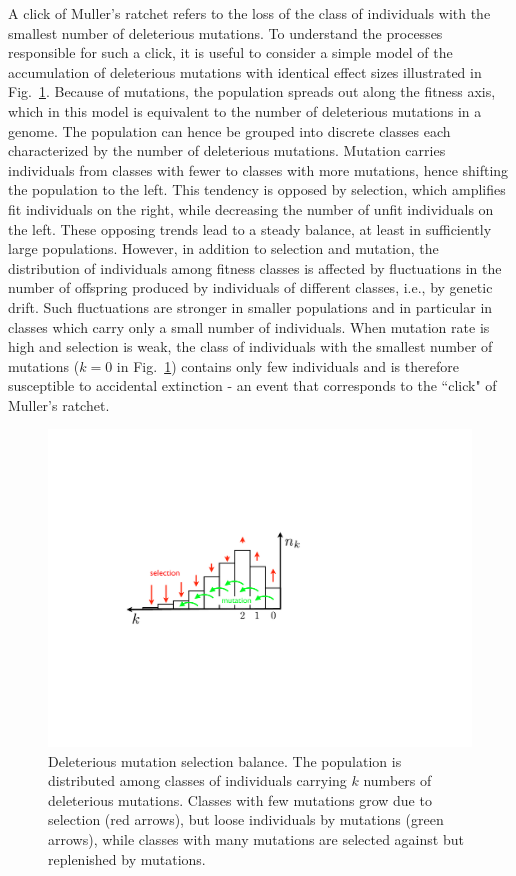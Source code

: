 \documentclass[rmp,preprint]{revtex4}
\newcommand{\FIG}[1]{Fig.~\ref{fig:#1}}
\begin{document}
A click of Muller's ratchet refers to the loss of the class of individuals with the smallest number of deleterious mutations. To understand the processes responsible for such a click, it is useful to consider a simple model of the accumulation of deleterious mutations with identical effect sizes illustrated in \FIG{sketch}. Because of mutations, the population spreads out along the fitness axis, which in this model is equivalent to the number of deleterious mutations in a genome. The population can hence be grouped into discrete classes each characterized by the number of deleterious mutations. Mutation carries individuals from classes with fewer to classes with more mutations, hence shifting the population to the left. This tendency is opposed by selection, which amplifies fit individuals on the right, while decreasing the number of unfit individuals on the left. These opposing trends lead to a steady balance, at least in sufficiently large populations. However, in addition to selection and mutation, the distribution of individuals among fitness classes is affected by fluctuations in the number of offspring produced by individuals of different classes, i.e., by genetic drift. Such fluctuations are stronger in smaller populations and in particular in classes which carry only a small number of individuals.  When mutation rate is high and selection is weak, the class of individuals with the smallest number of mutations ($k=0$ in \FIG{sketch}) contains only few individuals and is therefore susceptible to accidental extinction - an event that corresponds to the ``click" of Muller's ratchet.


\begin{figure}[b]
\begin{center}
  \includegraphics[width=0.5\columnwidth]{Figures/sketch}
  \caption[labelInTOC]{Deleterious mutation selection balance. The population is distributed among classes of individuals carrying $k$ numbers of deleterious mutations. Classes with few mutations grow due to selection (red arrows), but loose individuals by mutations (green arrows), while classes with many mutations are selected against but replenished by mutations. }
  \label{fig:sketch}
\end{center}
\end{figure}
\end{document}
